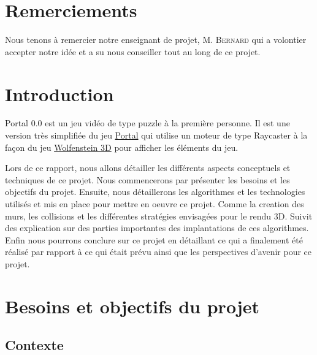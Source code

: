 \documentclass[11pt]{article}
\begin{document}
\newpage

\section*{Remerciements}

Nous tenons à remercier notre enseignant de projet, M. \textsc{Bernard} 
qui a volontier accepter notre idée et a su nous conseiller tout au long de ce projet.



\newpage

\tableofcontents

\newpage

\section{Introduction}

Portal 0.0 est un jeu vidéo de type puzzle à la première personne.
Il est une version très simplifiée du jeu \href{https://fr.wikipedia.org/wiki/Portal_(jeu_vid%C3%A9o)}{Portal}\cite{Portal}
qui utilise un moteur de type Raycaster à la façon du jeu
\href{https://fr.wikipedia.org/wiki/Wolfenstein_3D}{Wolfenstein 3D}\cite{Wolfenstein3D} pour afficher les éléments
du jeu.

Lors de ce rapport, nous allons détailler les différents aspects conceptuels et
techniques de ce projet. 
Nous commencerons par présenter les besoins et les objectifs du projet. 
Ensuite, nous détaillerons les algorithmes et les technologies utilisés et mis en place pour mettre en oeuvre ce projet.
Comme la creation des murs, les collisions et les différentes stratégies envisagées pour le rendu 3D.
Suivit des explication sur des parties importantes des implantations de ces algorithmes.
Enfin nous pourrons conclure sur ce projet en détaillant ce qui a finalement été réalisé par rapport à ce qui était prévu
ainsi que les perspectives d'avenir pour ce projet.

\section{Besoins et objectifs du projet}
\subsection{Contexte}
\end{document}
